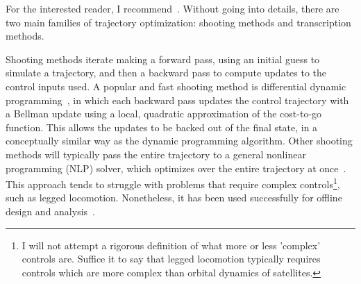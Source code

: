For the interested reader, I recommend~\cite{kelly2017introduction}. Without going into details, there are two main families of trajectory optimization: shooting methods and transcription methods.
\par
Shooting methods iterate making a forward pass, using an initial guess to simulate a trajectory, and then a backward pass to compute updates to the control inputs used.
A popular and fast shooting method is differential dynamic programming~\cite{tassa2011theory}, in which each backward pass updates the control trajectory with a Bellman update using a local, quadratic approximation of the cost-to-go function. This allows the updates to be backed out of the final state, in a conceptually similar way as the dynamic programming algorithm.
Other shooting methods will typically pass the entire trajectory to a general nonlinear programming (NLP) solver, which optimizes over the entire trajectory at once~\cite{kelly2017introduction}. This approach tends to struggle with problems that require complex controls\footnote{I will not attempt a rigorous definition of what more or less 'complex' controls are. Suffice it to say that legged locomotion typically requires controls which are more complex than orbital dynamics of satellites.}, such as legged locomotion. Nonetheless, it has been used successfully for offline design and analysis~\cite{mombaur_2009,remy2011matlab}. \par

